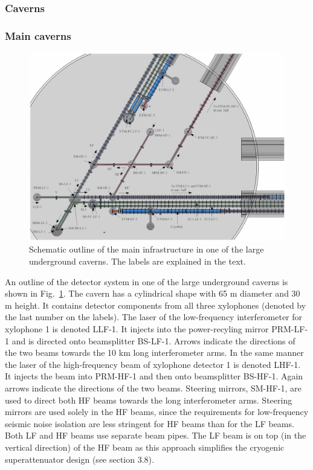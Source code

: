 \FloatBarrier
\subsubsection{Caverns}
\label{subsec:caverns}
\subsubsection*{Main caverns}

\begin{figure}[htbp!]
\centering
\includegraphics[width=22.5cm, angle=90]{./Sec_SiteInfra/Figures/infra3.jpg}
\caption{Schematic outline of the main infrastructure in one of the large underground caverns.
The labels are explained in the text.}
\label{fig:infra3}
\end{figure}
An outline of the detector system in one of the large underground caverns is shown in Fig.~\ref{fig:infra3}. The cavern has a cylindrical shape with 65 m diameter and 30 m height. It contains detector components from all three xylophones (denoted by the last number on the labels). The laser of the low-frequency interferometer for xylophone 1 is denoted LLF-1. It injects into the power-recyling mirror PRM-LF-1 and is directed onto beamsplitter BS-LF-1. Arrows indicate the directions of the two beams towards the 10 km long interferometer arms. In the same manner the laser of the high-frequency beam of xylophone detector 1 is denoted LHF-1. It injects the beam into PRM-HF-1 and then onto beamsplitter BS-HF-1. Again arrows indicate the directions of the two beams. Steering mirrors, SM-HF-1, are used to direct both HF beams towards the long interferometer arms. Steering mirrors are used solely in the HF beams, since the requirements for low-frequency seismic noise isolation are less stringent for HF beams than for the LF beams. Both LF and HF beams use separate beam pipes. The LF beam is on top (in the vertical direction) of the HF beam as this approach simplifies the cryogenic superattenuator design (see section 3.8).

